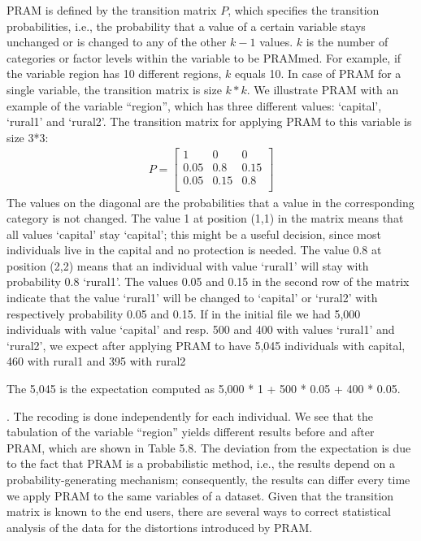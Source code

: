 \documentclass[letterpaper,10pt,english]{sphinxmanual}
\begin{document}
PRAM is defined by the transition matrix \(P\), which specifies the
transition probabilities, i.e., the probability that a value of a
certain variable stays unchanged or is changed to any of the other
\(k - 1\) values. \(k\) is the number of categories or factor
levels within the variable to be PRAMmed. For example, if the variable
region has 10 different regions, \(k\) equals 10. In case of PRAM
for a single variable, the transition matrix is size \(k*k\). We
illustrate PRAM with an example of the variable “region”, which has
three different values: ‘capital’, ‘rural1’ and ‘rural2’. The transition
matrix for applying PRAM to this variable is size 3*3:
\begin{equation*}
\begin{split}P = \begin{bmatrix}
1 & 0 & 0 \\
0.05 & 0.8 & 0.15 \\
0.05 & 0.15 & 0.8 \\
\end{bmatrix}\end{split}
\end{equation*}
The values on the diagonal are the probabilities that a value in the
corresponding category is not changed. The value 1 at position (1,1) in
the matrix means that all values ‘capital’ stay ‘capital’; this might be
a useful decision, since most individuals live in the capital and no
protection is needed. The value 0.8 at position (2,2) means that an
individual with value ‘rural1’ will stay with probability 0.8 ‘rural1’.
The values 0.05 and 0.15 in the second row of the matrix indicate that
the value ‘rural1’ will be changed to ‘capital’ or ‘rural2’ with
respectively probability 0.05 and 0.15. If in the initial file we had
5,000 individuals with value ‘capital’ and resp. 500 and 400 with values
‘rural1’ and ‘rural2’, we expect after applying PRAM to have 5,045
individuals with capital, 460 with rural1 and 395 with
rural2 %
\begin{footnote}[9]\sphinxAtStartFootnote
The 5,045 is the expectation computed as 5,000 * 1 + 500 * 0.05 +
400 * 0.05.
%
\end{footnote}. The recoding is done independently for
each individual. We see that the tabulation of the variable “region”
yields different results before and after PRAM, which are shown in Table
5.8. The deviation from the expectation is due to the fact that PRAM is
a probabilistic method, i.e., the results depend on a
probability-generating mechanism; consequently, the results can differ
every time we apply PRAM to the same variables of a dataset.   Given that the transition matrix
is known to the end users, there are several ways to correct statistical
analysis of the data for the distortions introduced by PRAM.
\end{document}
